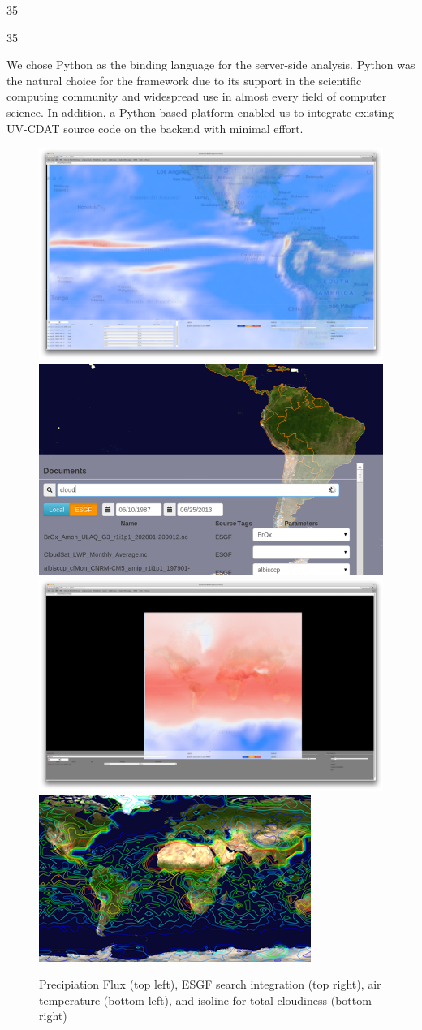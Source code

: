 \documentclass[a0,landscape]{a0poster}
\newenvironment{pcol}[1]{
  \begin{minipage}[t]{#1}
}{
  \end{minipage}
}
\begin{document}
\begin{textblock}{35}
\begin{pcol}{\threecolwidth}
\begin{textblock}{35}
\begin{pcol}{35cm}
We chose Python as the binding language for the server-side analysis. Python was the natural choice for the framework due to its support in the scientific computing community and widespread use in almost every field of computer science. In addition, a Python-based platform enabled us to integrate existing UV-CDAT source code on the backend with minimal effort.

\begin{figure}[montage]
  \vspace{0.7cm}
  \includegraphics[height=0.2\hsize]{images/PrecipiationFlux}
  \hspace{0.3cm}
  \includegraphics[height=0.2\hsize]{images/DataIntegrationImage}
  \\
  \vspace{0.7cm}
  \includegraphics[height=0.2\hsize]{images/AirTemp}
  \hspace{0.3cm}
  \includegraphics[height=0.2\hsize]{images/IsolineImage}
  \caption{Precipiation Flux (top left), ESGF search integration (top right), air temperature (bottom left), and isoline for total cloudiness (bottom right)}
  \nobreak
\end{figure}



\end{pcol}
\end{textblock}
\end{pcol}
\end{textblock}
\end{document}
